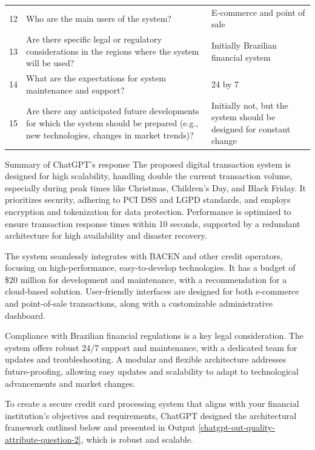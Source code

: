 \begin{table}[ht]
\begin{tabularx}{\textwidth}{|c|X|X|}
        \rowcolor{gray!19}
        12 & Who are the main users of the system? & E-commerce and point of sale \\        
        13 & Are there specific legal or regulatory considerations in the regions where the system will be used? & Initially Brazilian financial system \\
        \rowcolor{gray!19}
        14 & What are the expectations for system maintenance and support? & 24 by 7 \\        
        15 & Are there any anticipated future developments for which the system should be prepared (e.g., new technologies, changes in market trends)? & Initially not, but the system should be designed for constant change \\
        \hline
    \end{tabularx}
    \objectsource{\objectsourceauthor}
\end{table}
  

 Summary of ChatGPT's response
The proposed digital transaction system is designed for high scalability, handling double the current transaction volume, especially during peak times like Christmas, Children's Day, and Black Friday. It prioritizes security, adhering to PCI DSS and LGPD standards, and employs encryption and tokenization for data protection. Performance is optimized to ensure transaction response times within 10 seconds, supported by a redundant architecture for high availability and disaster recovery.

The system seamlessly integrates with BACEN and other credit operators, focusing on high-performance, easy-to-develop technologies. It has a budget of \$20 million for development and maintenance, with a recommendation for a cloud-based solution. User-friendly interfaces are designed for both e-commerce and point-of-sale transactions, along with a customizable administrative dashboard.

Compliance with Brazilian financial regulations is a key legal consideration. The system offers robust 24/7 support and maintenance, with a dedicated team for updates and troubleshooting. A modular and flexible architecture addresses future-proofing, allowing easy updates and scalability to adapt to technological advancements and market changes.

To create a secure credit card processing system that aligns with your financial institution's objectives and requirements, ChatGPT designed the architectural framework outlined below and presented in Output \ref{chatgpt-out-quality-attribute-question-2}, which is robust and scalable.

